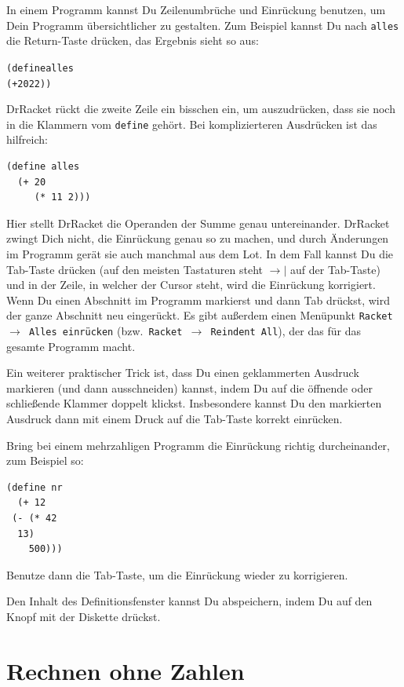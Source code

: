 In einem Programm kannst Du Zeilenumbrüche und Einrückung benutzen, um
Dein Programm übersichtlicher zu gestalten.  Zum Beispiel kannst Du
nach \texttt{alles} die Return-Taste drücken, das Ergebnis sieht so
aus:
%
\begin{alltt}
(define alles
  (+ 20 22))
\end{alltt}
%
DrRacket rückt die zweite Zeile ein bisschen ein, um auszudrücken,
dass sie noch in die Klammern vom \texttt{define} gehört.  Bei
komplizierteren Ausdrücken ist das hilfreich:
%
\begin{verbatim}
(define alles
  (+ 20
     (* 11 2)))
\end{verbatim}
%
Hier stellt DrRacket die Operanden der Summe genau untereinander.
DrRacket zwingt Dich nicht, die Einrückung genau so zu machen, und
durch Änderungen im Programm gerät sie auch manchmal aus dem Lot.  In
dem Fall kannst Du die Tab-Taste drücken (auf den meisten Tastaturen
steht $\longrightarrow\mid$ auf der Tab-Taste) und in der Zeile, in
welcher der Cursor steht, wird die Einrückung korrigiert.
Wenn Du einen Abschnitt im Programm markierst und dann Tab drückst,
wird der ganze Abschnitt neu eingerückt.  
Es gibt
außerdem einen Menüpunkt \texttt{Racket $\rightarrow$ Alles einrücken} (bzw.\
\texttt{Racket $\rightarrow$ Reindent All}), der das für das gesamte
Programm macht.

Ein weiterer praktischer Trick ist, dass Du einen geklammerten
Ausdruck markieren (und dann ausschneiden) kannst, indem Du auf die
öffnende oder schließende Klammer doppelt klickst.  Insbesondere
kannst Du den markierten Ausdruck dann mit einem Druck auf die
Tab-Taste korrekt einrücken.

\begin{aufgabe}
  Bring bei einem mehrzahligen Programm die Einrückung richtig
  durcheinander, zum Beispiel so:
\begin{verbatim}
(define nr
  (+ 12
 (- (* 42
  13)
    500)))
\end{verbatim}
  Benutze dann die Tab-Taste, um die Einrückung wieder zu korrigieren.
\end{aufgabe}
%
Den Inhalt des Definitionsfenster kannst Du abspeichern, indem Du auf
den Knopf mit der Diskette
 drückst.

\section{Rechnen ohne Zahlen}

